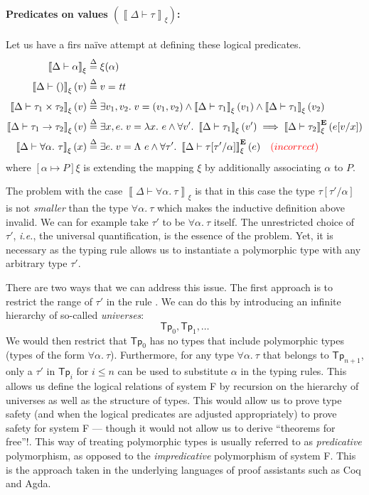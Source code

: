\documentclass{article}
\newcommand{\ie}{\textit{i.e.}}
\newcommand{\TT}{\mathit{tt}}
\newcommand{\UNT}{()}
\newcommand{\defeq}{\overset{\Delta}{=}}
\newcommand{\semtyp}[3]{\left\llbracket #2 \vdash #3 \right\rrbracket_{#1}}
\newcommand{\semErel}[1]{#1^{\textbf{E}}}
\newcommand{\semenv}{\xi}
\newcommand{\TLam}{\Lambda}
\newcommand{\CtxTps}{\Delta}
\newcommand{\expr}{e}
\newcommand{\val}{v}
\newcommand{\var}{x}
\newcommand{\typ}{\tau}
\newcommand{\TForall}{\forall}
\newcommand{\tvar}{\alpha}
\begin{document}
\paragraph{Predicates on values $\left(\semtyp{\semenv}{\CtxTps}{\typ}\right)$:}
Let us have a firs na\"ive attempt at defining these logical
predicates.
\begin{align*}
\semtyp{\semenv}{\CtxTps}{\tvar} \defeq{}& \semenv(\tvar)\\
\semtyp{\semenv}{\CtxTps}{\UNT}(\val) \defeq{}& \val = \TT\\
\semtyp{\semenv}{\CtxTps}{\typ_1 \times \typ_2}(\val) \defeq{}& \exists \val_1, \val_2.\; \val = (\val_1, \val_2) \land
\semtyp{\semenv}{\CtxTps}{\typ_1}(\val_1) \land \semtyp{\semenv}{\CtxTps}{\typ_1}(\val_2)\\
\semtyp{\semenv}{\CtxTps}{\typ_1 \to \typ_2}(\val) \defeq{}& \exists \var, \expr.\; \val = \lambda \var.~\expr\land
\forall \val'.~\semtyp{\semenv}{\CtxTps}{\typ_1}(\val') \implies \semErel{\semtyp{\semenv}{\CtxTps}{\typ_2}}(\expr[\val/\var])\\
\semtyp{\semenv}{\CtxTps}{\TForall \tvar.~\typ}(\var) \defeq{}& \exists \expr.\; \val = \TLam~\expr\land
\forall \typ'.~\semErel{\semtyp{\semenv}{\CtxTps}{\typ[\typ'/\tvar]}}(\expr) \hspace{1em} {\color{red}(incorrect)}
\end{align*}
where $[\tvar \mapsto P]\semenv$ is extending the mapping $\semenv$ by additionally associating $\tvar$ to $P$.

The problem with the case $\semtyp{\semenv}{\CtxTps}{\TForall \tvar.~\typ}$ is that in this case the type $\typ[\typ'/\tvar]$ is not \emph{smaller} than the type $\TForall \tvar.~\typ$ which makes the inductive definition above invalid.
We can for example take $\typ'$ to be $\TForall \tvar.~\typ$ itself.
The unrestricted choice of $\typ'$, \ie{}, the universal quantification, is the essence of the problem.
Yet, it is necessary as the typing rule  allows us to instantiate a polymorphic type with any arbitrary type $\typ'$.

There are two ways that we can address this issue.
The first approach is to restrict the range of $\typ'$ in the rule .
We can do this by introducing an infinite hierarchy of so-called \emph{universes}:
\[\mathsf{Tp}_0, \mathsf{Tp}_1, \dots\]
We would then restrict that $\mathsf{Tp}_0$ has no types that include polymorphic types (types of the form $\TForall \tvar.~\typ$).
Furthermore, for any type $\TForall \tvar.~\typ$ that belongs to $\mathsf{Tp}_{n+1}$, only a $\typ'$ in $\mathsf{Tp}_i$ for $i \le n$ can be used to substitute $\tvar$ in the typing rules.
This allows us define the logical relations of system F by recursion on the hierarchy of universes as well as the structure of types.
This would allow us to prove type safety (and when the logical predicates are adjusted appropriately) to prove safety for system F --- though it would not allow us to derive ``theorems for free''!.
This way of treating polymorphic types is usually referred to as \emph{predicative} polymorphism, as opposed to the \emph{impredicative} polymorphism of system F.
This is the approach taken in the underlying languages of proof assistants such as Coq and Agda.
\end{document}
